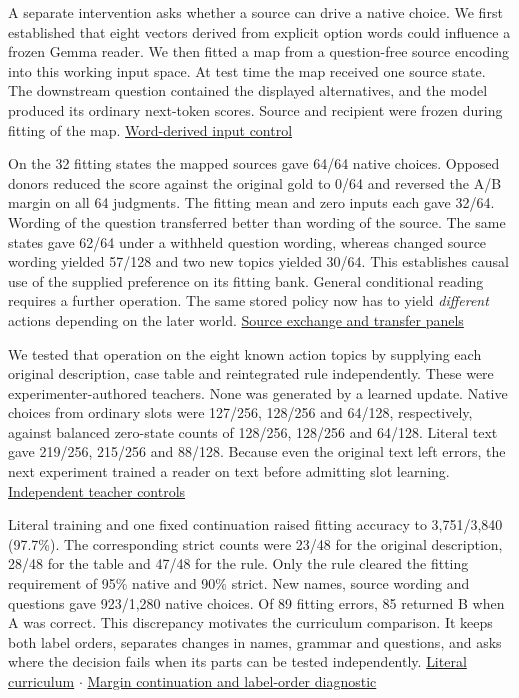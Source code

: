 \documentclass[11pt]{article}
\begin{document}
A separate intervention asks whether a source can drive a native choice. We first established that eight vectors derived from explicit option words could influence a frozen Gemma reader. We then fitted a map from a question-free source encoding into this working input space. At test time the map received one source state. The downstream question contained the displayed alternatives, and the model produced its ordinary next-token scores. Source and recipient were frozen during fitting of the map. \href{https://github.com/RyoSpiralArchitect/self-fold/blob/v1.0.0/provenance/slot_readout_20261103/RESULTS.md}{Word-derived input control}

On the 32 fitting states the mapped sources gave 64/64 native choices. Opposed donors reduced the score against the original gold to 0/64 and reversed the A/B margin on all 64 judgments. The fitting mean and zero inputs each gave 32/64. Wording of the question transferred better than wording of the source. The same states gave 62/64 under a withheld question wording, whereas changed source wording yielded 57/128 and two new topics yielded 30/64. This establishes causal use of the supplied preference on its fitting bank. General conditional reading requires a further operation. The same stored policy now has to yield \emph{different} actions depending on the later world. \href{https://github.com/RyoSpiralArchitect/self-fold/blob/v1.0.0/provenance/source_lexical_20261103/RESULTS.md}{Source exchange and transfer panels}

We tested that operation on the eight known action topics by supplying each original description, case table and reintegrated rule independently. These were experimenter-authored teachers. None was generated by a learned update. Native choices from ordinary slots were 127/256, 128/256 and 64/128, respectively, against balanced zero-state counts of 128/256, 128/256 and 64/128. Literal text gave 219/256, 215/256 and 88/128. Because even the original text left errors, the next experiment trained a reader on text before admitting slot learning. \href{https://github.com/RyoSpiralArchitect/self-fold/blob/v1.0.0/provenance/action_operation_20261103/RESULTS.md}{Independent teacher controls}

Literal training and one fixed continuation raised fitting accuracy to 3,751/3,840 (97.7\%). The corresponding strict counts were 23/48 for the original description, 28/48 for the table and 47/48 for the rule. Only the rule cleared the fitting requirement of 95\% native and 90\% strict. New names, source wording and questions gave 923/1,280 native choices. Of 89 fitting errors, 85 returned B when A was correct. This discrepancy motivates the curriculum comparison. It keeps both label orders, separates changes in names, grammar and questions, and asks where the decision fails when its parts can be tested independently. \href{https://github.com/RyoSpiralArchitect/self-fold/blob/v1.0.0/provenance/conditional_curriculum_20261103/RESULTS.md}{Literal curriculum} $\cdot$ \href{https://github.com/RyoSpiralArchitect/self-fold/blob/v1.0.0/provenance/conditional_margin_20261103/RESULTS.md}{Margin continuation and label-order diagnostic}
\end{document}

